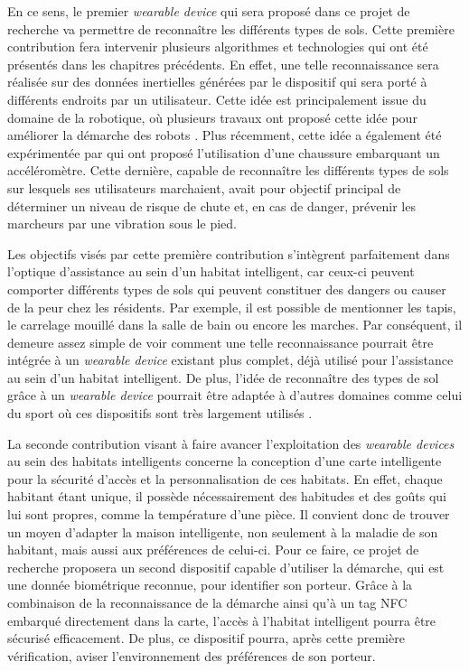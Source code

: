 En ce sens, le premier \textit{wearable device} qui sera proposé dans ce projet de recherche va permettre de reconnaître les différents types de sols. Cette première contribution fera intervenir plusieurs algorithmes et technologies qui ont été présentés dans les chapitres précédents. En effet, une telle reconnaissance sera réalisée sur des données inertielles générées par le dispositif qui sera porté à différents endroits par un utilisateur. Cette idée est principalement issue du domaine de la robotique, où plusieurs travaux ont proposé cette idée pour améliorer la démarche des robots \citep{Bibuli2007a, Weiss2007a, Kertesz2016a}. Plus récemment, cette idée a également été expérimentée par \cite{Otis2016a} qui ont proposé l'utilisation d'une chaussure embarquant un accéléromètre. Cette dernière, capable de reconnaître les différents types de sols sur lesquels ses utilisateurs marchaient, avait pour objectif principal de déterminer un niveau de risque de chute et, en cas de danger, prévenir les marcheurs par une vibration sous le pied. 

Les objectifs visés par cette première contribution s'intègrent parfaitement dans l'optique d'assistance au sein d'un habitat intelligent, car ceux-ci peuvent comporter différents types de sols qui peuvent constituer des dangers ou causer de la peur chez les résidents. Par exemple, il est possible de mentionner les tapis, le carrelage mouillé dans la salle de bain ou encore les marches. Par conséquent, il demeure assez simple de voir comment une telle reconnaissance pourrait être intégrée à un \textit{wearable device} existant plus complet, déjà utilisé pour l'assistance au sein d'un habitat intelligent. De plus, l'idée de reconnaître des types de sol grâce à un \textit{wearable device} pourrait être adaptée à d'autres domaines comme celui du sport où ces dispositifs sont très largement utilisés \citep{Nielsen2014b}.

La seconde contribution visant à faire avancer l'exploitation des \textit{wearable devices} au sein des habitats intelligents concerne la conception d'une carte intelligente pour la sécurité d'accès et la personnalisation de ces habitats. En effet, chaque habitant étant unique, il possède nécessairement des habitudes et des goûts qui lui sont propres, comme la température d'une pièce. Il convient donc de trouver un moyen d'adapter la maison intelligente, non seulement à la maladie de son habitant, mais aussi aux préférences de celui-ci. Pour ce faire, ce projet de recherche proposera un second dispositif capable d'utiliser la démarche, qui est une donnée biométrique reconnue, pour identifier son porteur. Grâce à la combinaison de la reconnaissance de la démarche ainsi qu'à un tag \acs{NFC} embarqué directement dans la carte, l'accès à l'habitat intelligent pourra être sécurisé efficacement. De plus, ce dispositif pourra, après cette première vérification, aviser l'environnement des préférences de son porteur.

